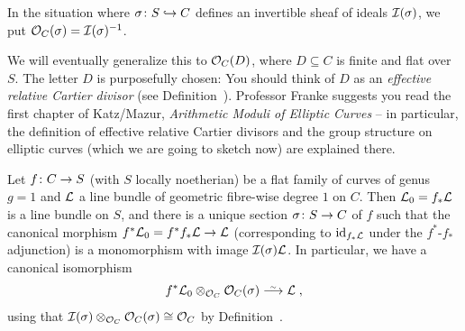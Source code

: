 \documentclass[a4paper,parskip=half,numbers=enddot, DIV=12]{scrreprt}
\begin{document}
\begin{defi}
	In the situation where $\sigma\colon S\monomorphism C$ defines an invertible sheaf of ideals $\mathcal{I}(\sigma)$, we put $\mathcal{O}_C(\sigma)=\mathcal{I}(\sigma)^{-1}$.
\end{defi}
\begin{rem}
	We will eventually generalize this to $\mathcal{O}_C(D)$, where $D\subseteq C$ is finite and flat over $S$. The letter $D$ is purposefully chosen: You should think of $D$ as an \emph{effective relative Cartier divisor} (see Definition~). Professor Franke suggests you read the first chapter of Katz/Mazur, \emph{Arithmetic Moduli of Elliptic Curves} \cite{katzmazur} -- in particular, the definition of effective relative Cartier divisors and the group structure on elliptic curves (which we are going to sketch now) are explained there.
\end{rem}
\begin{prop}
	Let $f\colon C\morphism S$ (with $S$ locally noetherian) be a flat family of curves of genus $g=1$ and $\mathcal{L}$ a line bundle of geometric fibre-wise degree $1$ on $C$. Then $\mathcal{L}_0=f_*\mathcal{L}$ is a line bundle on $S$, and there is a unique section $\sigma\colon S\morphism C$ of $f$ such that the canonical morphism $f^*\Ll_0=f^*f_*\Ll\morphism\Ll$ (corresponding to $\operatorname{id}_{f_*\mathcal{L}}$ under the $f^*$-$f_*$ adjunction) is a monomorphism with image $\mathcal{I}(\sigma)\mathcal{L}$. In particular, we have a canonical isomorphism
	\begin{align*}
		f^*\Ll_0\otimes_{\Oo_C}\Oo_C(\sigma)\isomorphism\Ll\;,
	\end{align*}
	using that $\mathcal{I}(\sigma)\otimes_{\mathcal{O}_C}\mathcal{O}_C(\sigma)\cong \mathcal{O}_C$ by Definition~.
\end{prop}
\end{document}
